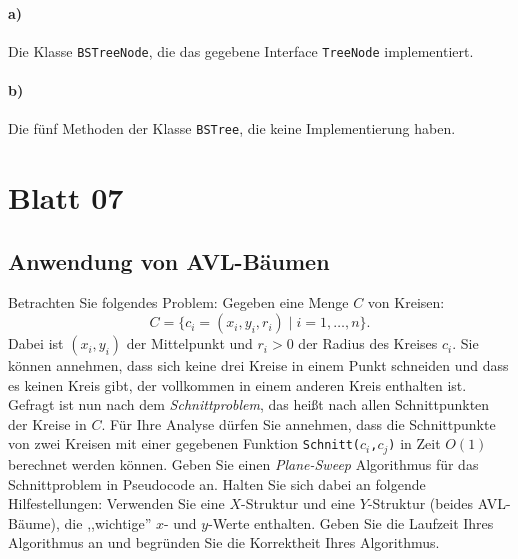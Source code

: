 \documentclass[paper=a4, fontsize=11pt]{scrartcl}
\numberwithin{equation}{section}
\numberwithin{figure}{section}
\numberwithin{table}{section}
\begin{document}
\paragraph{a)} 
Die Klasse \texttt{BSTreeNode}, die das gegebene Interface \texttt{TreeNode} implementiert.

\paragraph{b)} 
Die fünf Methoden der Klasse \texttt{BSTree}, die keine Implementierung haben.

\newpage
\section{Blatt 07}
\subsection{Anwendung von AVL-Bäumen}
Betrachten Sie folgendes Problem: Gegeben eine Menge $C$ von Kreisen:
\[ C = \{c_i = (x_i,y_i, r_i) \mid i = 1,\dots,n \}. \]
Dabei ist $(x_i,y_i)$ der Mittelpunkt und $r_i>0$ der Radius des Kreises $c_i$.
Sie können annehmen, dass sich keine drei Kreise in einem Punkt schneiden und dass es keinen Kreis gibt,
der vollkommen in einem anderen Kreis enthalten ist.
Gefragt ist nun nach dem \textit{Schnittproblem}, das heißt nach allen Schnittpunkten
der Kreise in $C$. Für Ihre Analyse dürfen Sie annehmen, dass die Schnittpunkte von
zwei Kreisen mit einer gegebenen Funktion \texttt{Schnitt($c_i$,$c_j$)} in Zeit $O(1)$ berechnet werden können.
Geben Sie einen \textit{Plane-Sweep} Algorithmus für das Schnittproblem in Pseudocode an.
Halten Sie sich dabei an folgende Hilfestellungen: Verwenden Sie eine $X$-Struktur
und eine $Y$-Struktur (beides AVL-Bäume), die ,,wichtige'' $x$- und $y$-Werte enthalten.
Geben Sie die Laufzeit Ihres Algorithmus an und begründen Sie die Korrektheit Ihres Algorithmus. \\
\end{document}
